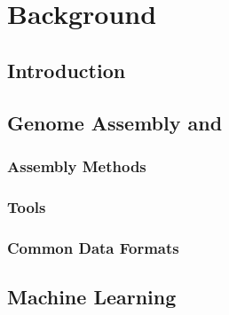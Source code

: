 \chapter{Background} \label{chap:sota}

\section*{}

\section{Introduction}

\section{Genome Assembly and \rnaseq}\label{sec:assembly}

\subsection{Assembly Methods}\label{sec:seqtools}

\subsection{\rnaseq{} Tools}\label{sec:seqtools}

\subsection{Common Data Formats}\label{sec:formats}

\section{Machine Learning}\label{sec:mlearning}
